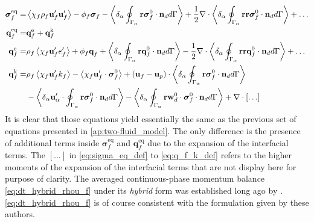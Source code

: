 \begin{align}
    \label{eq:sigma_eq_def}
    \bm{\sigma}_f^\text{eq}
    =& 
    \avg{\chi_f\rho_f\textbf{u}_f'\textbf{u}_f'}
    - \phi_f \bm{\sigma}_f%
    - \pSavg{{\textbf{r}\bm{\sigma}_f^0 \cdot \textbf{n}_d}}
    +\frac{1}{2}\div \pSavg{{\textbf{rr}\bm{\sigma}_f^0 \cdot \textbf{n}_d}}
    + \ldots
    \\
    \textbf{q}_f^\text{eq}
    =&\textbf{q}_f^\text{e} +\textbf{q}_f^\text{k} \nonumber \\
    \textbf{q}_f^\text{e}
    =& \rho_f \avg{\chi_f \textbf{u}_f' e_f'} 
    + \phi_f\textbf{q}_f 
    +\pSavg{{\textbf{r}\textbf{q}_f^0 \cdot \textbf{n}_d}} 
    -\frac{1}{2}\div \pSavg{{\textbf{rr}\textbf{q}_f^0 \cdot \textbf{n}_d}} 
    + \ldots
    \\
    \textbf{q}_f^\text{k}
    =& \rho_f \avg{\chi_f \textbf{u}_f' k_f} 
    - \avg{\chi_f \textbf{u}_f' \cdot \bm{\sigma}_f^0}
    + (\textbf{u}_f - \textbf{u}_p)\cdot
    \pSavg{{\textbf{r}\bm{\sigma}_f^0 \cdot \textbf{n}_d}}
    \label{eq:q_f_k_def}
    \\\nonumber &
    - \pavg{ \textbf{u}_\alpha' \cdot \intS{ \textbf{r} \bm{\sigma}_f^0 \cdot \textbf{n}_d}}
    - \pavg{ \intS{\textbf{r}\textbf{w}_d^0 \cdot \bm{\sigma}_f^0 \cdot \textbf{n}_d}}
    + \div[\ldots]
\end{align}
It is clear that those equations yield essentially the same as the previous set of equations presented in \ref{ap:two-fluid_model}.
The only difference is the presence of additional terms inside $\bm{\sigma}^\text{eq}_f$ and $\textbf{q}^\text{eq}_f$ due to the expansion of the interfacial terms. 
The $[\ldots]$ in \ref{eq:sigma_eq_def} to \ref{eq:q_f_k_def} refers to the higher moments of the expansion of the interfacial terms that are not display here for purpose of clarity. 
The averaged continuous-phase momentum balance \eqref{eq:dt_hybrid_rhou_f} under its \textit{hybrid} form was established long ago by \citet{zhang1997momentum,jackson1997locally}.  
\ref{eq:dt_hybrid_rhou_f} is of course consistent with the formulation given by these authors.

